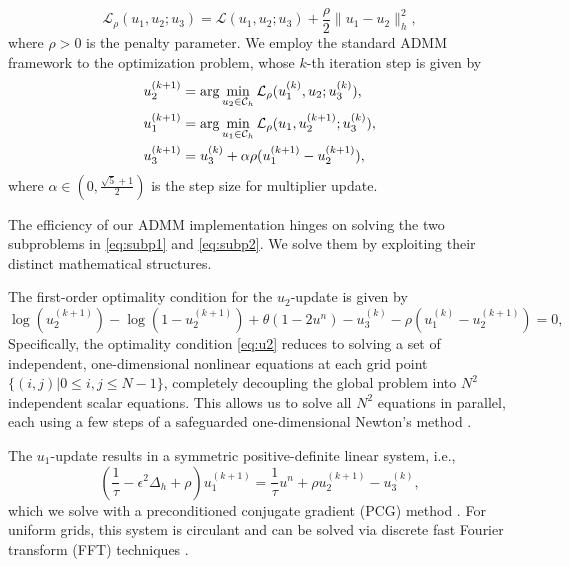 \begin{equation}
    \mathcal{L}_{\rho}(u_1,u_2;u_3)=\mathcal{L}(u_1,u_2;u_3)+\frac{\rho}{2}\|u_1-u_2\|_h^2,
\end{equation}
where $\rho>0$ is the penalty parameter. We employ the standard ADMM framework \cite{neal2011distributed} to the optimization problem, whose $k$-th iteration step is given by
\begin{subequations}
    \begin{align}
        \label{eq:subp1}
        &u_2^{(k+1)}=\arg \min_{u_2\in {\mathcal{C}_h}} \mathcal{L}_{\rho}(u_1^{(k)},u_2;u_3^{(k)}),\\
        \label{eq:subp2}
        &u_1^{(k+1)}=\arg \min_{u_1\in {\mathcal{C}_h}} \mathcal{L}_{\rho}(u_1,u_2^{(k+1)};u_3^{(k)}),\\
        &u_3^{(k+1)}=u_3^{(k)}+\alpha\rho(u_1^{(k+1)}-u_2^{(k+1)}),
    \end{align}
\end{subequations}
where $\alpha\in(0,\frac{\sqrt{5}+1}{2})$ is the step size for multiplier update.
\par The efficiency of our ADMM implementation hinges on solving the two subproblems in \eqref{eq:subp1} and \eqref{eq:subp2}. 
We solve them by exploiting their distinct mathematical structures.
\par The first-order optimality condition for the $u_2$-update is given  by
\begin{equation}
    \label{eq:u2}
    \log(u_2^{(k+1)})-\log(1-u_2^{(k+1)})+
    \theta(1-2u^n)-u_3^{(k)}-\rho(u_1^{(k)}-u_2^{(k+1)})=0,
\end{equation}                                                            
Specifically, the optimality condition \eqref{eq:u2} reduces to solving a set of independent, one-dimensional nonlinear equations at each grid point $\{(i,j)|0\leq i,j \leq N-1\}$, 
completely decoupling the global problem into $N^2$ independent scalar equations. 
This allows us to solve all $N^2$ equations in parallel, each using a few steps of a safeguarded one-dimensional Newton's method \cite{dennis1996numerical,ortega2000iterative}.

\par The $u_1$-update results in a symmetric positive-definite linear system, i.e., 
    \begin{equation}
    \label{eq:u1}
        (\frac{1}{\tau}-\epsilon^2\Delta_h+\rho)u_1^{(k+1)}=\frac{1}{\tau}u^n+\rho u_2^{(k+1)}-u_3^{(k)},
    \end{equation}
which we solve with a preconditioned conjugate gradient (PCG) method \cite{concus1976generalized}. 
For uniform grids, this system is circulant and can be solved via discrete fast Fourier transform (FFT) techniques \cite{cooley1965algorithm}.

